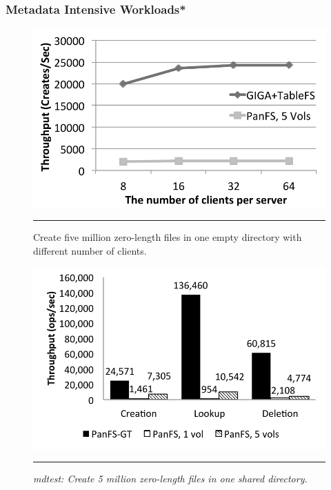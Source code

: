 \subsubsection{Metadata Intensive Workloads*}

\begin{figure}[t]  %
\centerline{\includegraphics[scale=0.5]{./figs/zero_file_creation_on_panfs}}
\vspace{10pt}
\caption{\normalsize
Create five million zero-length files in one empty directory
with different number of clients.
\textit{}
}
\vspace{10pt}
\hrule
\label{graph:ldb-singlenode}
\end{figure}       %

\begin{figure}[t]  %
\centerline{\includegraphics[scale=0.6]{./figs/mdtest}}
\vspace{10pt}
\caption{\normalsize
\textit{mdtest:
Create 5 million zero-length files in one shared directory.
}
}
\vspace{10pt}
\hrule
\label{graph:ldb-singlenode}
\end{figure}       %


